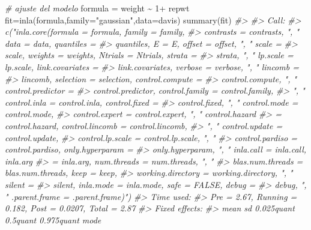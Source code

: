 \documentclass[
]{book}
\newenvironment{Shaded}{\begin{snugshade}}{\end{snugshade}}
\newcommand{\AttributeTok}[1]{\textcolor[rgb]{0.77,0.63,0.00}{#1}}
\newcommand{\CommentTok}[1]{\textcolor[rgb]{0.56,0.35,0.01}{\textit{#1}}}
\newcommand{\DecValTok}[1]{\textcolor[rgb]{0.00,0.00,0.81}{#1}}
\newcommand{\FunctionTok}[1]{\textcolor[rgb]{0.00,0.00,0.00}{#1}}
\newcommand{\NormalTok}[1]{#1}
\newcommand{\OtherTok}[1]{\textcolor[rgb]{0.56,0.35,0.01}{#1}}
\newcommand{\SpecialCharTok}[1]{\textcolor[rgb]{0.00,0.00,0.00}{#1}}
\newcommand{\StringTok}[1]{\textcolor[rgb]{0.31,0.60,0.02}{#1}}
\begin{document}
\begin{Shaded}
\begin{Highlighting}[]
\CommentTok{\# ajuste del modelo }
\NormalTok{formula }\OtherTok{=}\NormalTok{ weight }\SpecialCharTok{\textasciitilde{}} \DecValTok{1}\SpecialCharTok{+}\NormalTok{ repwt}
\NormalTok{fit}\OtherTok{=}\FunctionTok{inla}\NormalTok{(formula,}\AttributeTok{family=}\StringTok{"gaussian"}\NormalTok{,}\AttributeTok{data=}\NormalTok{davis)}
\FunctionTok{summary}\NormalTok{(fit)}
\CommentTok{\#\textgreater{} }
\CommentTok{\#\textgreater{} Call:}
\CommentTok{\#\textgreater{}    c("inla.core(formula = formula, family = family, }
\CommentTok{\#\textgreater{}    contrasts = contrasts, ", " data = data, quantiles = }
\CommentTok{\#\textgreater{}    quantiles, E = E, offset = offset, ", " scale = }
\CommentTok{\#\textgreater{}    scale, weights = weights, Ntrials = Ntrials, strata = }
\CommentTok{\#\textgreater{}    strata, ", " lp.scale = lp.scale, link.covariates = }
\CommentTok{\#\textgreater{}    link.covariates, verbose = verbose, ", " lincomb = }
\CommentTok{\#\textgreater{}    lincomb, selection = selection, control.compute = }
\CommentTok{\#\textgreater{}    control.compute, ", " control.predictor = }
\CommentTok{\#\textgreater{}    control.predictor, control.family = control.family, }
\CommentTok{\#\textgreater{}    ", " control.inla = control.inla, control.fixed = }
\CommentTok{\#\textgreater{}    control.fixed, ", " control.mode = control.mode, }
\CommentTok{\#\textgreater{}    control.expert = control.expert, ", " control.hazard }
\CommentTok{\#\textgreater{}    = control.hazard, control.lincomb = control.lincomb, }
\CommentTok{\#\textgreater{}    ", " control.update = control.update, }
\CommentTok{\#\textgreater{}    control.lp.scale = control.lp.scale, ", " }
\CommentTok{\#\textgreater{}    control.pardiso = control.pardiso, only.hyperparam = }
\CommentTok{\#\textgreater{}    only.hyperparam, ", " inla.call = inla.call, inla.arg }
\CommentTok{\#\textgreater{}    = inla.arg, num.threads = num.threads, ", " }
\CommentTok{\#\textgreater{}    blas.num.threads = blas.num.threads, keep = keep, }
\CommentTok{\#\textgreater{}    working.directory = working.directory, ", " silent = }
\CommentTok{\#\textgreater{}    silent, inla.mode = inla.mode, safe = FALSE, debug = }
\CommentTok{\#\textgreater{}    debug, ", " .parent.frame = .parent.frame)") }
\CommentTok{\#\textgreater{} Time used:}
\CommentTok{\#\textgreater{}     Pre = 2.67, Running = 0.182, Post = 0.0207, Total = 2.87 }
\CommentTok{\#\textgreater{} Fixed effects:}
\CommentTok{\#\textgreater{}              mean    sd 0.025quant 0.5quant 0.975quant mode}

\end{Highlighting}
\end{Shaded}
\end{document}

